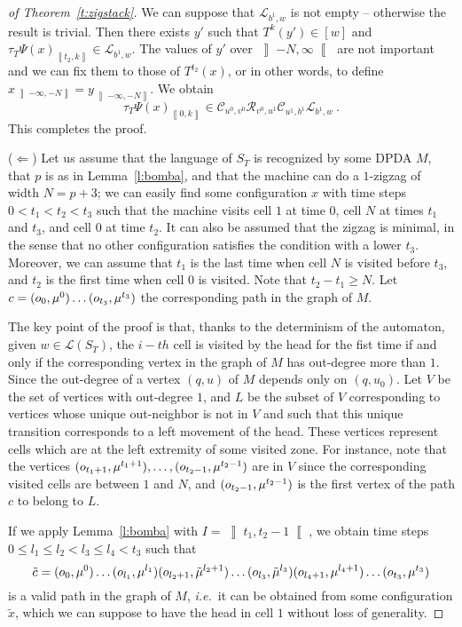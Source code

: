 \documentclass{llncs}
\newcommand{\lang}{\mathcal L}
\newcommand{\co}[2]{\left\llbracket #1,#2\right\llbracket}\newcommand{\cc}[2]{\left\llbracket #1,#2\right\rrbracket}\newcommand{\oo}[2]{\left\rrbracket #1,#2\right\llbracket}\newcommand{\oc}[2]{\left\rrbracket #1,#2\right\rrbracket}\newcommand{\ci}[1]{\co{#1}\infty}\newcommand{\io}[1]{\oo{-\infty}{#1}}\newcommand{\oi}[1]{\oo{#1}\infty}\newcommand{\ic}[1]{\oc{-\infty}{#1}}
\newcommand{\scc}[2]{_{\cc{#1}{#2}}}\newcommand{\sco}[2]{_{\co{#1}{#2}}}\newcommand{\soo}[2]{_{\oo{#1}{#2}}}\newcommand{\soc}[2]{_{\oc{#1}{#2}}}\newcommand{\sci}[1]{_{\ci{#1}}}\newcommand{\sio}[1]{_{\io{#1}}}\newcommand{\soi}[1]{_{\oi{#1}}}\newcommand{\sic}[1]{_{\ic{#1}}}
\newcommand{\ie}{\textit{i.e.}\ }
\begin{document}
\begin{proof}[of Theorem~\ref{t:zigstack}]
We can suppose that $\mathcal L_{b^1,w}$ is not empty -- otherwise the result is trivial. Then there exists $y'$ such that $T^{k}(y')\in [w]$ and $\tau_T\Psi(x)\scc{t_2}{k}\in \mathcal L_{b^1,w}$.
The values of $y'$ over $\oi{-N}$ are not important and we can fix them to those of $T^{t_2}(x)$, or in other words, to define $x\sic{-N}=y\sic{-N}$. We obtain
$$\tau_T\Psi(x)\scc0k\in\mathcal C_{u^0,v^0}\mathcal R_{v^0,u^1}\mathcal C_{u^1,b^1}\mathcal L_{b^1,w}~.$$
This completes the proof.

($\Leftarrow$)
Let us assume that the language of $S_T$ is recognized by some DPDA $M$, that $p$ is as in Lemma~\ref{l:bomba}, and that the machine can do a $1$-zigzag of width $N=p+3$;  we can easily find some configuration $x$ with time steps $0<t_1<t_2<t_3$ such that the machine visits cell $1$ at time $0$, cell $N$ at times $t_1$ and $t_3$, and cell $0$ at time $t_2$.
It can also be assumed that the zigzag is minimal, in the sense that no other configuration satisfies the condition with a lower $t_3$. Moreover, we can assume that $t_1$ is the last time when cell $N$ is visited before $t_3$, and $t_2$ is the first time when cell $0$ is visited. Note that $t_2-t_1\ge N$. Let $c=\pile0\ldots\pile{t_3}$ the corresponding path in the graph of $M$.

The key point of the proof is that, thanks to the determinism of the automaton, given $w \in\lang(S_T)$, the $i-th$ cell is visited by the head for the fist time if and only if the corresponding vertex in the graph of $M$ has out-degree more than $1$.
Since the out-degree of a vertex $(q,u)$ of $M$ depends only on $(q,u_0)$.
Let $V$ be the set of vertices with out-degree $1$, and $L$ be the subset of $V$ corresponding to vertices whose unique out-neighbor is not in $V$ and such that this unique transition corresponds to a left movement of the head. These vertices represent cells which are at the left extremity of some visited zone.
For instance, note that the vertices $\pile{t_1+1},\ldots,\pile{t_2-1}$ are in $V$ since the corresponding visited cells are between $1$ and $N$, and $\pile{t_2-1}$ is the first vertex of the path $c$ to belong to $L$.

If we apply Lemma~\ref{l:bomba} with $I=\oo{t_1}{t_2-1}$, we obtain time steps $0\le l_1\le l_2<l_3 \le l_4<t_3$ such that 
$$\tilde c=\pile0\ldots\pile{l_1}\pile[\tilde]{l_2+1}\ldots\pile[\tilde]{l_3}\pile{l_4+1}\ldots\pile{t_3}$$
is a valid path in the graph of $M$, \ie it can be obtained from some configuration $\tilde x$, which we can suppose to have the head in cell $1$ without loss of generality.


\end{proof}
\end{document}
